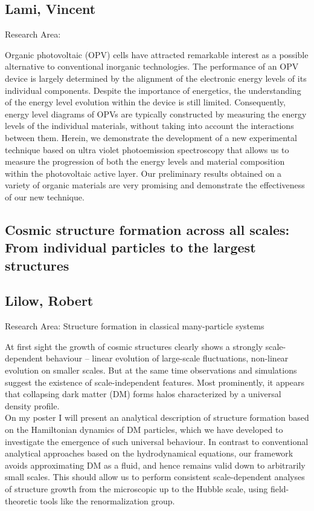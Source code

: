 \subsection*{\centering \normalsize Lami, Vincent}
Research Area: \newline

\noindent Organic photovoltaic (OPV) cells have attracted remarkable interest as a possible alternative to conventional inorganic technologies. The performance of an OPV device is largely determined by the alignment of the electronic energy levels of its individual components. Despite the importance of energetics, the understanding of the energy level evolution within the device is still limited. Consequently, energy level diagrams of OPVs are typically constructed by measuring the energy levels of the individual materials, without taking into account the interactions between them. Herein, we demonstrate the development of a new experimental technique based on ultra violet photoemission spectroscopy that allows us to measure the progression of both the energy levels and material composition within the photovoltaic active layer. Our preliminary results obtained on a variety of organic materials are very promising and demonstrate the effectiveness of our new technique.

\subsection*{\centering \large Cosmic structure formation across all scales: From individual particles to the largest structures}
\subsection*{\centering \normalsize Lilow, Robert}
Research Area: Structure formation in classical many-particle systems\newline

\noindent At first sight the growth of cosmic structures clearly shows a strongly scale-dependent behaviour -- linear evolution of large-scale fluctuations, non-linear evolution on smaller scales. But at the same time observations and simulations suggest the existence of scale-independent features. Most prominently, it appears that collapsing dark matter (DM) forms halos characterized by a universal density profile.\\On my poster I will present an analytical description of structure formation based on the Hamiltonian dynamics of DM particles, which we have developed to investigate the emergence of such universal behaviour. In contrast to conventional analytical approaches based on the hydrodynamical equations, our framework avoids approximating DM as a fluid, and hence remains valid down to arbitrarily small scales. This should allow us to perform consistent scale-dependent analyses of structure growth from the microscopic up to the Hubble scale, using field-theoretic tools like the renormalization group.
\newpage
